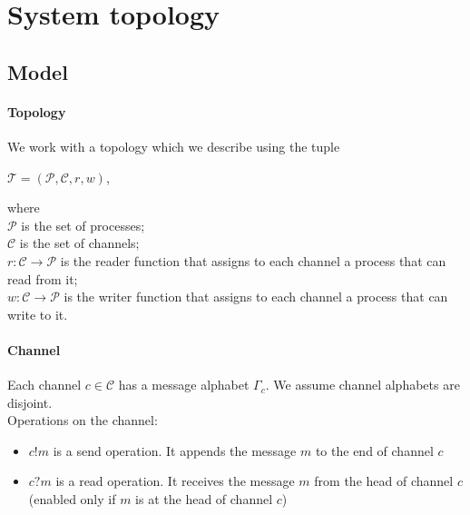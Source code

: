 \documentclass[a4paper,UKenglish,cleveref, autoref, thm-restate]{lipics-v2019}
\begin{document}






\section{System topology}

\subsection{Model}


\paragraph*{Topology}
We work with a topology which we describe using the tuple 
\begin{center}
$\mathcal{T}= (\mathcal{P}, \mathcal{C}, r, w)$,
\end{center}
where \\
\hspace*{1cm} $\mathcal{P}$ is the set of processes; \\
\hspace*{1cm} $\mathcal{C}$ is the set of channels; \\
\hspace*{1cm} $r:\mathcal{C}  \rightarrow \mathcal{P}$ is the reader function that assigns to each channel a process that can read from it;\\
\hspace*{1cm} $w:\mathcal{C} \rightarrow \mathcal{P}$ is the writer function that assigns to each channel a process that can write to it.


\paragraph*{Channel}

Each channel $c \in \mathcal{C}$ has a message alphabet $\Gamma_c$. We assume channel alphabets are disjoint.\\
Operations on the channel: 
\begin{itemize}
\item $c!m$ is a send operation. It appends the message $m$ to the end of channel $c$
\item $c?m$ is a read operation. It receives the message $m$ from the head of channel $c$ (enabled only if $m$ is at the head of channel $c$)

\end{itemize}
\end{document}
